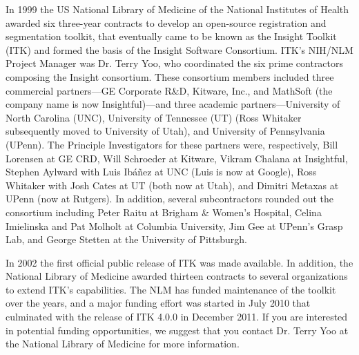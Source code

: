 In 1999 the US National Library of Medicine of the National Institutes of
Health awarded six three-year contracts to develop an open-source
registration and segmentation toolkit, that eventually came to be known as
the Insight Toolkit (ITK) and formed the basis of the Insight Software
Consortium. ITK's NIH/NLM Project Manager was Dr. Terry Yoo, who coordinated the
six prime contractors composing the Insight consortium. These consortium
members included three commercial partners---GE Corporate R\&D, Kitware,
Inc., and MathSoft (the company name is now Insightful)---and three academic
partners---University of North Carolina (UNC), University of Tennessee (UT)
(Ross Whitaker subsequently moved to University of Utah), and University of
Pennsylvania (UPenn). The Principle Investigators for these partners were,
respectively, Bill Lorensen at GE CRD, Will Schroeder at Kitware, Vikram
Chalana at Insightful, Stephen Aylward with Luis Ib\'{a}\~{n}ez at UNC (Luis
is now at Google), Ross Whitaker with Josh Cates at UT (both now at Utah),
and Dimitri Metaxas at UPenn (now at Rutgers). In addition, several
subcontractors rounded out the consortium including Peter Raitu at Brigham \&
Women's Hospital, Celina Imielinska and Pat Molholt at Columbia University,
Jim Gee at UPenn's Grasp Lab, and George Stetten at the University of
Pittsburgh.

In 2002 the first official public release of ITK was made available. In
addition, the National Library of Medicine awarded thirteen contracts to
several organizations to extend ITK's capabilities. The NLM has funded
maintenance of the toolkit over the years, and a major funding effort was
started in July 2010 that culminated with the release of ITK 4.0.0 in
December 2011.  If you are interested in potential funding opportunities,
we suggest that you contact Dr. Terry Yoo at the National Library of Medicine
for more information.

